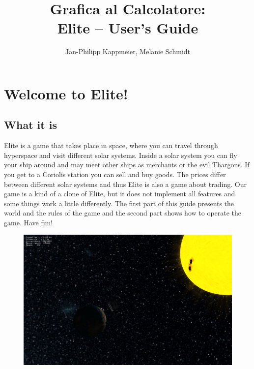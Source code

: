 \documentclass[a4paper,11pt]{article}
\begin{document}
\title{Grafica al Calcolatore: \\ Elite -- User's Guide}
\author{Jan-Philipp Kappmeier, Melanie Schmidt}
\maketitle
\thispagestyle{empty}

\section{Welcome to Elite!}
\subsection{What it is}
Elite is a game that takes place in space, where you can travel through hyperspace and visit different solar systems. Inside a solar system you can fly your ship around and may meet other ships as merchants or the evil Thargons. If you get to a Coriolis station you can sell and buy goods. The prices differ between different solar systems and thus Elite is also a game about trading.
Our game is a kind of a clone of Elite, but it does not implement all features and some things work a little differently. The first part of this guide presents the world and the rules of the game and the second part shows how to operate the game. Have fun!

\begin{figure}[htbp]
	\centering
		\includegraphics[width=1.00\textwidth]{screenshot4.jpg}
\end{figure}
\end{document}
